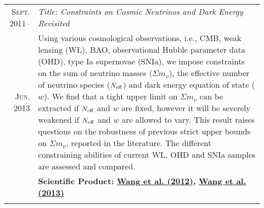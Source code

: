 \documentclass[letterpaper,10pt]{article}
\newcommand{\narrow}{-1.8ex}
\begin{document}
\begin{longtable}{r|p{5.6in}}
  \textsc{Sept. 2011}--   &   \emph{Title: Constraints on Cosmic Neutrinos and Dark Energy Revisited}  \\
  \textsc{Jun. 2013}     &   \small{Using various cosmological observations, i.e., CMB, weak lensing (WL),
  BAO, observational Hubble parameter data (OHD), type Ia supernovae (SNIa), we impose constraints on the sum
  of neutrino masses ($\Sigma m_{\nu}$), the effective number of neutrino species ($N_{\rm eff}$) and dark
  energy equation of state ($w$). We find that a tight upper limit on $\Sigma m_{\nu}$ can be extracted if
  $N_{\rm eff}$ and $w$ are fixed, however it will be severely weakened if $N_{\rm eff}$ and $w$ are allowed
  to vary. This result raises questions on the robustness of previous strict upper bounds on $\Sigma m_{\nu}$,
  reported in the literature.
  The different constraining abilities of current WL, OHD and SNIa samples are assessed and compared.}\\
  &   \textbf{Scientific Product:
        \hyperlink{12.wang.jcap}{Wang et al. (2012)},
        \hyperlink{13.wang.raa}{Wang et al. (2013)}}  \\
  \multicolumn{2}{c}{} \\[\narrow]


\end{longtable}
\end{document}
